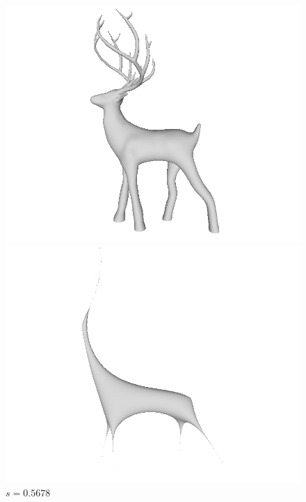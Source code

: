 \documentclass[11pt]{amsart}
\begin{document}
\begin{figure}[H]
\begin{center}
\begin{minipage}[!h]{.33\textwidth}
\centering
\includegraphics[width=\textwidth]{christmasdeer}
\caption*{$s = 0.4055$} \label{fig:christmasdeer}
\end{minipage}%
\hfill
\begin{minipage}[!h]{0.33\textwidth}
\centering
\includegraphics[width=\textwidth]{christmasdeerCMCF2}
\caption*{$s = 0.5678$} \label{fig:christmasdeercmcf2}
\end{minipage}%

\end{center}
\end{figure}
\end{document}
